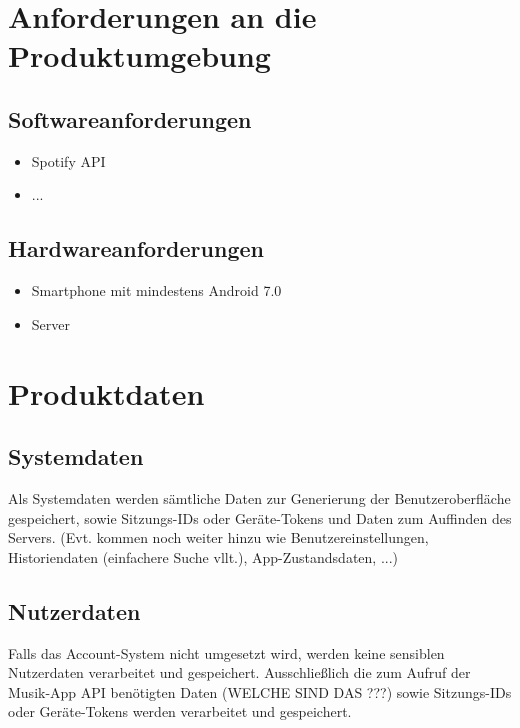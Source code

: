 \documentclass[oneside, ngerman]{sdqtechreport}
\begin{document}
\chapter{Anforderungen an die Produktumgebung}
\label{chap:Produktumgebung}

\section{Softwareanforderungen}
\label{sec:Produktumgebung:Softwareanforderungen}

\begin{itemize}
    \item Spotify API
    \item ...
\end{itemize}

\section{Hardwareanforderungen}
\label{sec:Produktumgebung:Hardwareanforderungen}

\begin{itemize}
    \item Smartphone mit mindestens Android 7.0
    \item Server
\end{itemize}



\chapter{Produktdaten}
\label{chap:Produktdaten}

\section{Systemdaten}
\label{sec:Produktdaten:Systemdaten}

Als Systemdaten werden sämtliche Daten zur Generierung der Benutzeroberfläche gespeichert, sowie Sitzungs-IDs oder Geräte-Tokens und Daten zum Auffinden des Servers. (Evt. kommen noch weiter hinzu wie Benutzereinstellungen, Historiendaten (einfachere Suche vllt.),  App-Zustandsdaten, ...)

\section{Nutzerdaten}
\label{sec:Produktdaten:Nutzerdaten}

Falls das Account-System nicht umgesetzt wird, werden keine sensiblen Nutzerdaten verarbeitet und gespeichert. Ausschließlich die zum Aufruf der Musik-App API benötigten Daten (WELCHE SIND DAS ???) sowie Sitzungs-IDs oder Geräte-Tokens werden verarbeitet und gespeichert.
\end{document}
